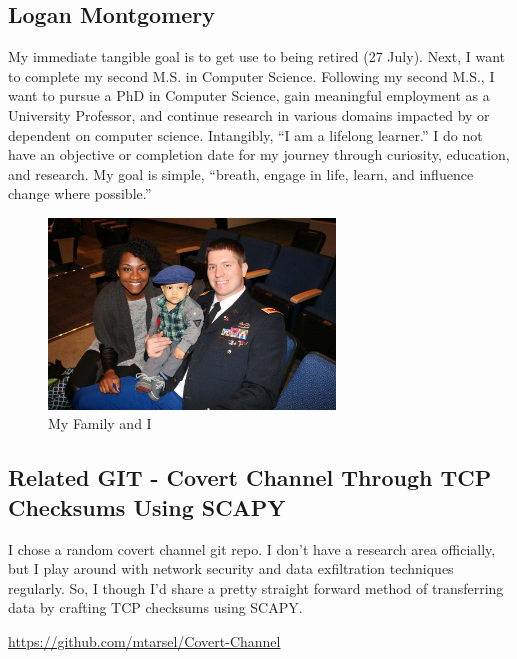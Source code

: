 \subsection{Logan Montgomery}
My immediate tangible goal is to get use to being retired (27 July).  Next, I want to complete my second M.S. in Computer Science.  Following my second M.S., I want to pursue a PhD in Computer Science, gain meaningful employment as a University Professor, and continue research in various domains impacted by or dependent on computer science.  Intangibly, “I am a lifelong learner.”  I do not have an objective or completion date for my journey through curiosity, education, and research.  My goal is simple, “breath, engage in life, learn, and influence change where possible.”

\begin{figure}[ht]
	\centering
    \includegraphics[width=3in]{myimage}
    \caption{My Family and I}
    \label{fig:My Family and I}
\end{figure}

\subsection{Related GIT - Covert Channel Through TCP Checksums Using SCAPY}
I chose a random covert channel git repo.  I don't have a research area officially, but I play around with network security and data exfiltration techniques regularly.  So, I though I'd share a pretty straight forward method of transferring data by crafting TCP checksums using SCAPY.   

\url{https://github.com/mtarsel/Covert-Channel}